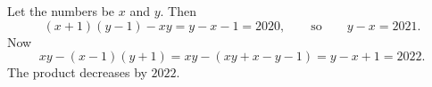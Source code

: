 Let the numbers be $x$ and $y$. Then
\[(x+1)(y-1)-xy=y-x-1=2020,\qquad\text{so}\qquad y-x=2021.\]
Now
\[xy-(x-1)(y+1)=xy-\left(xy+x-y-1\right)=y-x+1=2022.\]
The product decreases by $\boxed{2022}$.
